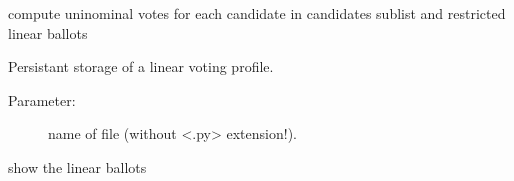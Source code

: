 \documentclass[letterpaper,10pt,english]{sphinxmanual}
\begin{document}
\begin{fulllineitems}
\begin{fulllineitems}
\end{fulllineitems}


\begin{fulllineitems}
\label{techDoc:votingDigraphs.LinearVotingProfile.computeUninominalVotes}
compute uninominal votes for each candidate in candidates sublist
and restricted linear ballots

\end{fulllineitems}


\begin{fulllineitems}
\label{techDoc:votingDigraphs.LinearVotingProfile.save}
Persistant storage of a linear voting profile.
\begin{description}
\item[{Parameter:}] \leavevmode
name of file (without \textless{}.py\textgreater{} extension!).

\end{description}

\end{fulllineitems}


\begin{fulllineitems}
\label{techDoc:votingDigraphs.LinearVotingProfile.showLinearBallots}
show the linear ballots

\end{fulllineitems}


\end{fulllineitems}

\end{document}
